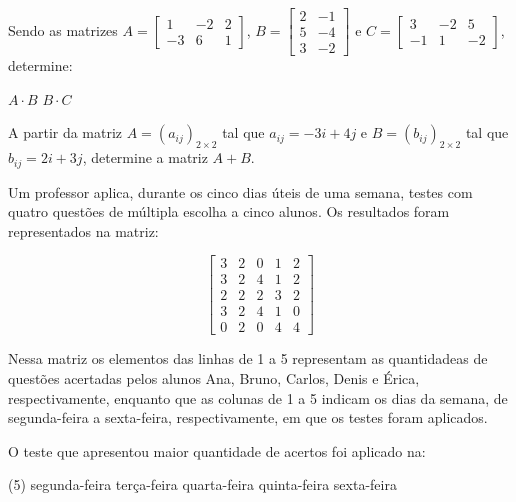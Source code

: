\documentclass[a4paper,11pt,addpoints]{exam}
\begin{document}
\begin{questions}
	\question[1]

	Sendo as matrizes $A = \begin{bmatrix}
			1 & -2 & 2 \\
			-3 & 6 & 1
		\end{bmatrix}$, $B = \begin{bmatrix}
			2 & -1 \\
			5 & -4 \\
			3 & -2
		\end{bmatrix}$ e $C = \begin{bmatrix}
			3  & -2 & 5  \\
			-1 & 1  & -2
		\end{bmatrix}$, determine:

	\begin{tasks}
		\task $A \cdot B$
		\task $B \cdot C$
	\end{tasks}

	\question[1]

	A partir da matriz $A = (a_{ij})_{2 \times 2}$ tal que $a_{ij} = -3i + 4j$
	e $B = (b_{ij})_{2 \times 2}$ tal que $b_{ij} = 2i + 3j$,
	determine a matriz $A + B$.

	\question[1]

    Um professor aplica, durante os cinco dias úteis de uma semana, testes com quatro
    questões de múltipla escolha a cinco alunos. Os resultados foram representados
    na matriz:


	\begin{equation*}
		\begin{bmatrix}
            3 & 2 & 0 & 1 & 2 \\
            3 & 2 & 4 & 1 & 2 \\
            2 & 2 & 2 & 3 & 2 \\
            3 & 2 & 4 & 1 & 0 \\
            0 & 2 & 0 & 4 & 4
		\end{bmatrix}
	\end{equation*}

    Nessa matriz os elementos das linhas de 1 a 5 representam as quantidadeas de questões
    acertadas pelos alunos Ana, Bruno, Carlos, Denis e Érica, respectivamente, enquanto
    que as colunas de 1 a 5 indicam os dias da semana, de segunda-feira a sexta-feira,
    respectivamente, em que os testes foram aplicados.

    O teste que apresentou maior quantidade de acertos foi aplicado na:

	\begin{tasks}(5)
		\task segunda-feira
		\task terça-feira
		\task quarta-feira
		\task quinta-feira
		\task sexta-feira
	\end{tasks}



\end{questions}
\end{document}
